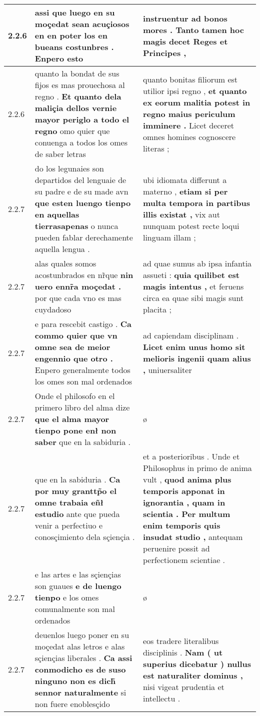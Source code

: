 \begin{tabular}{|p{1cm}|p{6.5cm}|p{6.5cm}|}
2.2.6 & assi que luego en su moçedat sean acuçiosos \textbf{ en en poter los en bueans costunbres . } Enpero esto & instruentur \textbf{ ad bonos mores . } Tanto tamen hoc magis decet Reges et Principes , \\\hline
2.2.6 & quanto la bondat de sus fijos es mas prouechosa al regno . \textbf{ Et quanto dela maliçia dellos vernie mayor periglo a todo el regno } omo quier que conuenga a todos los omes de saber letras & quanto bonitas filiorum est utilior ipsi regno , \textbf{ et quanto ex eorum malitia potest in regno maius periculum imminere . } Licet deceret omnes homines cognoscere literas ; \\\hline
2.2.7 & do los legunaies son departidos del lenguaie de su padre e de su made avn \textbf{ que esten luengo tienpo en aquellas tierrasapenas } o nunca pueden fablar derechamente aquella lengua . & ubi idiomata differunt a materno , \textbf{ etiam si per multa tempora in partibus illis existat , } vix aut nunquam potest recte loqui linguam illam ; \\\hline
2.2.7 & alas quales somos acostunbrados en nr̃que \textbf{ nin uero ennr̃a moçedat . } por que cada vno es mas cuydadoso & ad quae sumus ab ipsa infantia assueti : \textbf{ quia quilibet est magis intentus , } et feruens circa ea quae sibi magis sunt placita ; \\\hline
2.2.7 & e para rescebit castigo . \textbf{ Ca commo quier que vn omne sea de meior engennio que otro . } Enpero generalmente todos los omes son mal ordenados & ad capiendam disciplinam . \textbf{ Licet enim unus homo sit melioris ingenii quam alius , } uniuersaliter \\\hline
2.2.7 & Onde el philosofo en el primero libro del alma dize \textbf{ que el alma mayor tienpo pone enł non saber } que en la sabiduria . & ø \\\hline
2.2.7 & que en la sabiduria . \textbf{ Ca por muy granttp̃o el omne trabaia eñł estudio } ante que pueda venir a perfectiuo e conosçimiento dela sçiençia . & et a posterioribus . Unde et Philosophus in primo de anima vult , \textbf{ quod anima plus temporis apponat in ignorantia , quam in scientia . Per multum enim temporis quis insudat studio , } antequam peruenire possit ad perfectionem scientiae . \\\hline
2.2.7 & e las artes e las sçiençias son guaues \textbf{ e de luengo tienpo } e los omes comunalmente son mal ordenados & ø \\\hline
2.2.7 & deuenlos luego poner en su moçedat alas letros e alas sçiençias liberales . \textbf{ Ca assi conmodicho es de suso ninguno non es dich̃ sennor naturalmente } si non fuere enoblesçido & eos tradere literalibus disciplinis . \textbf{ Nam ( ut superius dicebatur ) nullus est naturaliter dominus , } nisi vigeat prudentia et intellectu . \\\hline

\end{tabular}

